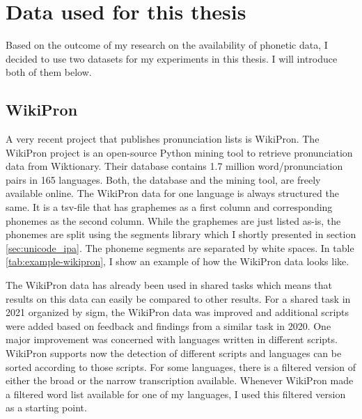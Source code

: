 \section{Data used for this thesis}
\label{sec:dataset}
Based on the outcome of my research on the availability of phonetic data, I decided to use two datasets for my experiments in this thesis. I will introduce both of them below. 

\subsection{WikiPron}
\label{sec:wikipron}
A very recent project that publishes pronunciation lists is WikiPron. The WikiPron project \citep{Lee&Ashby.2020} is an open-source Python mining tool to retrieve pronunciation data from Wiktionary. Their database contains 1.7 million word/pronunciation pairs in 165 languages. Both, the database and the mining tool, are freely available online. The WikiPron data for one language is always structured the same. It is a tsv-file that has graphemes as a first column and corresponding phonemes as the second column. While the graphemes are just listed as-is, the phonemes are split using the segments library which I shortly presented in section \ref{sec:unicode_ipa}. The phoneme segments are separated by white spaces. In table \ref{tab:example-wikipron}, I show an example of how the WikiPron data looks like.

The WikiPron data has already been used in shared tasks which means that results on this data can easily be compared to other results. For a shared task in 2021 organized by \ac{sigm}, the WikiPron data was improved and additional scripts were added based on feedback and findings from a similar task in 2020. One major improvement was concerned with languages written in different scripts. WikiPron supports now the detection of different scripts and languages can be sorted according to those scripts. For some languages, there is a filtered version of either the broad or the narrow transcription available. Whenever WikiPron made a filtered word list available for one of my languages, I used this filtered version as a starting point.

